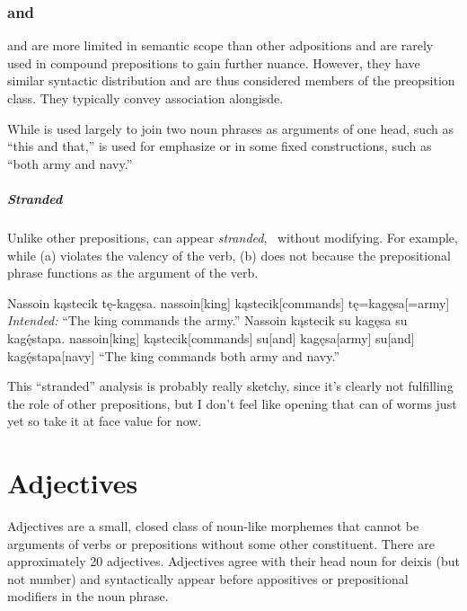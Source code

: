 \subsection{ and } \label{subsec:u_and_su}
 and  are more limited in semantic scope than other adpositions and are rarely used in compound prepositions to gain further nuance. However, they have similar syntactic distribution and are thus considered members of the preopsition class. They typically convey association alongisde.

While  is used largely to join two noun phrases as arguments of one head, such as  “this and that,”  is used for emphasize or in some fixed constructions, such as  “both army and navy.”

\paragraph{Stranded }
Unlike other prepositions,  can appear \emph{stranded}, \ie\ without modifying. For example, while (\nextx a) violates the valency of the verb, (\nextx b) does not because the prepositional phrase functions as the argument of the verb.

\begin{gloss*}
    \a \ljudge{*} \begingl
        \glpreamble Nassoin kąstecik tę-kagęsa. \endpreamble
        nassoin[king]
        kąstecik[commands]
        tę=kagęsa[=army]
        \glft \emph{Intended:} “The king commands the army.”
    \endgl
    \a \begingl
        \glpreamble Nassoin kąstecik su kagęsa su kagę́stapa. \endpreamble
        nassoin[king]
        kąstecik[commands]
        su[and]
        kagęsa[army]
        su[and]
        kagę́stapa[navy]
        \glft “The king commands both army and navy.”
    \endgl
\end{gloss*}

\begin{kaobox}[frametitle=\sc todo:]
    This “stranded” analysis is probably really sketchy, since it's clearly not fulfilling the role of other prepositions, but I don't feel like opening that can of worms just yet so take it at face value for now.
\end{kaobox}

\setchapterpreamble[u]{\margintoc}
\chapter{Adjectives}
Adjectives are a small, closed class of noun-like morphemes that cannot be arguments of verbs or prepositions without some other constituent. There are approximately 20 adjectives. Adjectives agree with their head noun for deixis (but not number) and syntactically appear before appositives or prepositional modifiers in the noun phrase.

